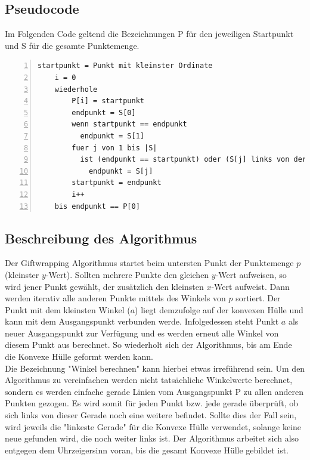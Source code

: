\documentclass[Labor, MSC, german]{twbook}
\begin{document}
\subsection{Pseudocode}
Im Folgenden Code geltend die Bezeichnungen P für den jeweiligen Startpunkt und S für die gesamte Punktemenge.

\begin{lstlisting}[language=PseudoCode,numbers=left, breaklines=true, caption={Giftwrapping Pseudocode \cite{Wikipedia_GiftWrapping}}]
    startpunkt = Punkt mit kleinster Ordinate
    i = 0
    wiederhole
        P[i] = startpunkt
        endpunkt = S[0]
        wenn startpunkt == endpunkt
          endpunkt = S[1]
        fuer j von 1 bis |S|
          ist (endpunkt == startpunkt) oder (S[j] links von der Geraden zwischen startpunkt und endpunkt)
            endpunkt = S[j]
        startpunkt = endpunkt
        i++
    bis endpunkt == P[0]
\end{lstlisting}

    
\subsection{Beschreibung des Algorithmus}
Der Giftwrapping Algorithmus startet beim untersten Punkt der Punktemenge $p$ (kleinster $y$-Wert). Sollten mehrere Punkte den gleichen $y$-Wert aufweisen, so wird jener Punkt gewählt, der zusätzlich den kleinsten $x$-Wert aufweist. Dann werden iterativ alle anderen Punkte mittels des Winkels von $p$ sortiert. Der Punkt mit dem kleinsten Winkel ($a$) liegt demzufolge auf der konvexen Hülle und kann mit dem Ausgangspunkt verbunden werde. Infolgedessen steht Punkt $a$ als neuer Ausgangspunkt zur Verfügung und es werden erneut alle Winkel von diesem Punkt aus berechnet. So wiederholt sich der Algorithmus, bis am Ende die Konvexe Hülle geformt werden kann.\\

Die Bezeichnung "Winkel berechnen" kann hierbei etwas irreführend sein. Um den Algorithmus zu vereinfachen werden nicht tatsächliche Winkelwerte berechnet, sondern es werden einfache gerade Linien vom Ausgangspunkt P zu allen anderen Punkten gezogen. Es wird somit für jeden Punkt bzw. jede gerade überprüft, ob sich links von dieser Gerade noch eine weitere befindet. Sollte dies der Fall sein, wird jeweils die "linkeste Gerade" für die Konvexe Hülle verwendet, solange keine neue gefunden wird, die noch weiter links ist. Der Algorithmus arbeitet sich also entgegen dem Uhrzeigersinn voran, bis die gesamt Konvexe Hülle gebildet ist.
\end{document}
